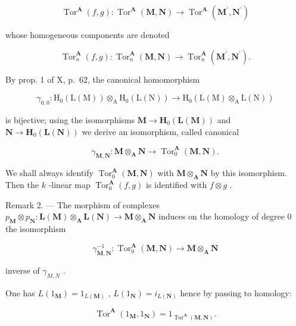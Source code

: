 \[
\operatorname{Tor} ^ {\mathbf {A}} (f, g): \operatorname{Tor} ^ {\mathbf {A}} (\mathbf {M}, \mathbf {N}) \rightarrow \operatorname{Tor} ^ {\mathbf {A}} (\mathbf {M} ^ {\prime}, \mathbf {N} ^ {\prime})
\]

whose homogeneous components are denoted

\[
\operatorname{Tor} _ {n} ^ {\mathbf {A}} (f, g): \operatorname{Tor} _ {n} ^ {\mathbf {A}} (\mathbf {M}, \mathbf {N}) \rightarrow \operatorname{Tor} _ {n} ^ {\mathbf {A}} (\mathbf {M} ^ {\prime}, \mathbf {N} ^ {\prime}).
\]

By prop. 1 of X, p.~62, the canonical homomorphism

\[
\gamma_ {0, 0}: \mathrm{H} _ {0} (\mathrm{L} (\mathrm{M})) \otimes_ {\mathrm{A}} \mathrm{H} _ {0} (\mathrm{L} (\mathrm{N})) \rightarrow \mathrm{H} _ {0} (\mathrm{L} (\mathrm{M}) \otimes_ {\mathrm{A}} \mathrm{L} (\mathrm{N}))
\]

is bijective; using the isomorphisms \(\mathbf{M} \to \mathbf{H}_{0}(\mathbf{L}(\mathbf{M}))\) and \(\mathbf{N} \to \mathbf{H}_{0}(\mathbf{L}(\mathbf{N}))\) we derive an isomorphism, called canonical

\[
\gamma_ {\mathbf {M}, \mathbf {N}}: \mathbf {M} \otimes_ {\mathbf {A}} \mathbf {N} \rightarrow \operatorname{Tor} _ {0} ^ {\mathbf {A}} (\mathbf {M}, \mathbf {N}).\tag{7}
\]

We shall always identify \(\operatorname{Tor}_{0}^{\mathbf{A}}(\mathbf{M},\mathbf{N})\) with \(\mathbf{M}\otimes_{\mathbf{A}}\mathbf{N}\) by this isomorphism. Then the \(k\) -linear map \(\operatorname{Tor}_{0}^{\mathbf{A}}(f,g)\) is identified with \(f\otimes g\) .

Remark 2. --- The morphism of complexes \(p_{\mathbf{M}} \otimes p_{\mathbf{N}}: \mathbf{L}(\mathbf{M}) \otimes_{\mathbf{A}} \mathbf{L}(\mathbf{N}) \to \mathbf{M} \otimes_{\mathbf{A}} \mathbf{N}\) induces on the homology of degree 0 the isomorphism

\[
\gamma_ {\mathbf {M}, \mathbf {N}} ^ {- 1}: \operatorname{Tor} _ {0} ^ {\mathbf {A}} (\mathbf {M}, \mathbf {N}) \rightarrow \mathbf {M} \otimes_ {\mathbf {A}} \mathbf {N}
\]

inverse of \(\gamma_{M,N}\) .

One has \(L(1_{\mathbf{M}}) = 1_{L(\mathbf{M})}\) , \(L(1_{\mathbf{N}}) = i_{L(\mathbf{N})}\) hence by passing to homology:

\[
\operatorname{Tor} ^ {\mathbf {A}} \left(1 _ {\mathbf {M}}, 1 _ {\mathbf {N}}\right) = 1 _ {\operatorname{Tor} ^ {\mathbf {A}} (\mathbf {M}, \mathbf {N})}.\tag{8}
\]

